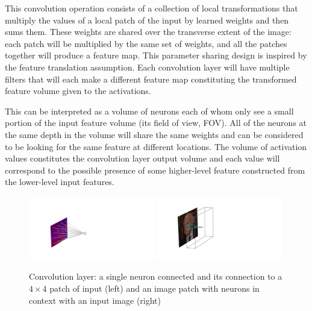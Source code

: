 This convolution operation consists of a collection of local transformations that multiply the values of a local patch of the input by learned weights and then sums them. These weights are shared over the transverse extent of the image: each patch will be multiplied by the same set of weights, and all the patches together will produce a feature map. This parameter sharing design is inspired by the feature translation assumption. Each convolution layer will have multiple filters that will each make a different feature map constituting the transformed feature volume given to the activations.


This can be interpreted as a volume of neurons each of whom only see a small portion of the input feature volume (its field of view, FOV). All of the neurons at the same depth in the volume will share the same weights and can be considered to be looking for the same feature at different locations. The volume of activation values constitutes the convolution layer output volume and each value will correspond to the possible presence of some higher-level feature constructed from the lower-level input features. 

\begin{figure}[h!]
    \begin{center}
        \includegraphics[width=0.49\textwidth]{figures/machine_learning/convolution_neuron.pdf}
        \includegraphics[width=0.49\textwidth]{figures/machine_learning/convolution_layer.pdf}
    \end{center}
    \caption{Convolution layer: a single neuron connected and its connection to a $4\times{}4$ patch of input (left) and an image patch with neurons in context with an input image \cite{Higgs_photo} (right)}
        \label{fig:machine_learning:convolution}
\end{figure}

